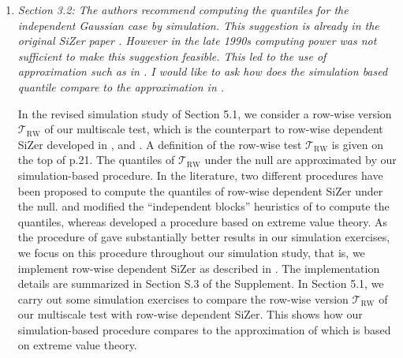 \documentclass[a4paper,12pt]{article}
\begin{document}
\begin{enumerate}[label=(\arabic*),leftmargin=0.7cm]

\item \textit{Section 3.2: The authors recommend computing the quantiles for the independent Gaussian case by simulation. This suggestion is already in the original SiZer paper \citep{ChaudhuriMarron1999}. However in the late 1990s computing power was not sufficient to make this suggestion feasible. This led to the use of approximation such as in \cite{HannigMarron2006}. I would like to ask how does the simulation based quantile compare to the approximation in \cite{HannigMarron2006}.} 

In the revised simulation study of Section 5.1, we consider a row-wise version $\mathcal{T}_{\text{RW}}$ of our multiscale test, which is the counterpart to row-wise dependent SiZer developed in \cite{Rondonotti2004}, \cite{Rondonotti2007} and \cite{ParkHannigKang2009}. A definition of the row-wise test $\mathcal{T}_{\text{RW}}$ is given on the top of p.21. The quantiles of $\mathcal{T}_{\text{RW}}$ under the null are approximated by our simulation-based procedure. \newline
%
In the literature, two different procedures have been proposed to compute the quantiles of row-wise dependent SiZer under the null. \cite{Rondonotti2004} and \cite{Rondonotti2007} modified the ``independent blocks'' heuristics of \cite{ChaudhuriMarron1999} to compute the quantiles, whereas \cite{ParkHannigKang2009} developed a procedure based on extreme value theory. As the procedure of \cite{ParkHannigKang2009} gave substantially better results in our simulation exercises, we focus on this procedure throughout our simulation study, that is, we implement row-wise dependent SiZer as described in \cite{ParkHannigKang2009}. The implementation details are summarized in Section S.3 of the Supplement. \newline
%
In Section 5.1, we carry out some simulation exercises to compare the row-wise version $\mathcal{T}_{\text{RW}}$ of our multiscale test with row-wise dependent SiZer. This shows how our simulation-based procedure compares to the approximation of \cite{ParkHannigKang2009} which is based on extreme value theory.



\end{enumerate}
\end{document}
